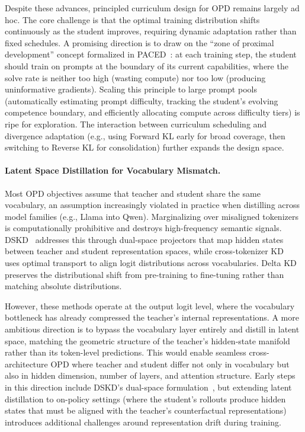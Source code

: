 \documentclass{article} %
\begin{document}
Despite these advances, principled curriculum design for OPD remains largely ad hoc. The core challenge is that the optimal training distribution shifts continuously as the student improves, requiring dynamic adaptation rather than fixed schedules. A promising direction is to draw on the ``zone of proximal development'' concept formalized in PACED~\citep{2603.11178}: at each training step, the student should train on prompts at the boundary of its current capabilities, where the solve rate is neither too high (wasting compute) nor too low (producing uninformative gradients). Scaling this principle to large prompt pools (automatically estimating prompt difficulty, tracking the student's evolving competence boundary, and efficiently allocating compute across difficulty tiers) is ripe for exploration. The interaction between curriculum scheduling and divergence adaptation (e.g., using Forward KL early for broad coverage, then switching to Reverse KL for consolidation) further expands the design space.

\paragraph{Latent Space Distillation for Vocabulary Mismatch.}
Most OPD objectives assume that teacher and student share the same vocabulary, an assumption increasingly violated in practice when distilling across model families (e.g., Llama into Qwen). Marginalizing over misaligned tokenizers is computationally prohibitive and destroys high-frequency semantic signals. DSKD~\citep{2504.11426} addresses this through dual-space projectors that map hidden states between teacher and student representation spaces, while cross-tokenizer KD~\citep{2402.12030} uses optimal transport to align logit distributions across vocabularies. Delta KD~\citep{2509.14526} preserves the distributional shift from pre-training to fine-tuning rather than matching absolute distributions.

However, these methods operate at the output logit level, where the vocabulary bottleneck has already compressed the teacher's internal representations. A more ambitious direction is to bypass the vocabulary layer entirely and distill in latent space, matching the geometric structure of the teacher's hidden-state manifold rather than its token-level predictions. This would enable seamless cross-architecture OPD where teacher and student differ not only in vocabulary but also in hidden dimension, number of layers, and attention structure. Early steps in this direction include DSKD's dual-space formulation~\citep{2504.11426}, but extending latent distillation to on-policy settings (where the student's rollouts produce hidden states that must be aligned with the teacher's counterfactual representations) introduces additional challenges around representation drift during training.
\end{document}
